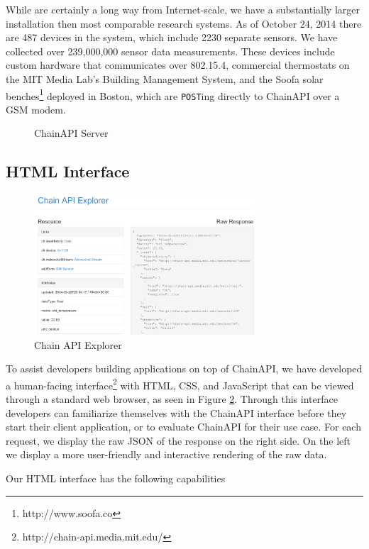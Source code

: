 \documentclass{acm_proc_article-sp}
\begin{document}
While are certainly a long way from Internet-scale, we have a substantially
larger installation then most comparable research systems. As of October 24,
2014 there are 487 devices in the system, which include 2230 separate sensors.
We have collected over 239,000,000 sensor data measurements. These devices
include custom hardware that communicates over 802.15.4, commercial thermostats
on the MIT Media Lab's Building Management System, and the Soofa solar
benches\footnote{http://www.soofa.co} deployed in Boston, which are
\texttt{POST}ing directly to ChainAPI over a GSM modem.

\begin{figure}
    \centering
    
    \caption{ChainAPI Server}
    \label{chain_actual}
\end{figure}

\subsection{HTML Interface}

\begin{figure}
    \centering
    \includegraphics[width=8.45cm, frame]{chain_explorer2}
    \caption{Chain API Explorer}
    \label{chain_explorer}
\end{figure}

To assist developers building applications on top of ChainAPI, we have
developed a human-facing interface\footnote{http://chain-api.media.mit.edu/}
with HTML, CSS, and JavaScript that can be viewed through a standard web
browser, as seen in Figure \ref{chain_explorer}.  Through this interface
developers can familiarize themselves with the ChainAPI interface before they
start their client application, or to evaluate ChainAPI for their use case.
For each request, we display the raw JSON of the response on the right side. On
the left we display a more user-friendly and interactive rendering of the raw
data.

Our HTML interface has the following capabilities
\end{document}
